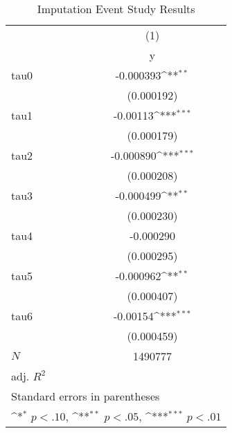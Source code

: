 \begin{table}[htbp]\centering
\def\sym#1{\ifmmode^{#1}\else\(^{#1}\)\fi}
\caption{Imputation Event Study Results}
\begin{tabular}{l*{1}{c}}
\hline\hline
            &\multicolumn{1}{c}{(1)}\\
            &\multicolumn{1}{c}{y}\\
\hline
tau0        &   -0.000393\sym{**} \\
            &  (0.000192)         \\
[1em]
tau1        &    -0.00113\sym{***}\\
            &  (0.000179)         \\
[1em]
tau2        &   -0.000890\sym{***}\\
            &  (0.000208)         \\
[1em]
tau3        &   -0.000499\sym{**} \\
            &  (0.000230)         \\
[1em]
tau4        &   -0.000290         \\
            &  (0.000295)         \\
[1em]
tau5        &   -0.000962\sym{**} \\
            &  (0.000407)         \\
[1em]
tau6        &    -0.00154\sym{***}\\
            &  (0.000459)         \\
\hline
\(N\)       &     1490777         \\
adj. \(R^{2}\)&                     \\
\hline\hline
\multicolumn{2}{l}{\footnotesize Standard errors in parentheses}\\
\multicolumn{2}{l}{\footnotesize \sym{*} \(p<.10\), \sym{**} \(p<.05\), \sym{***} \(p<.01\)}\\
\end{tabular}
\end{table}
